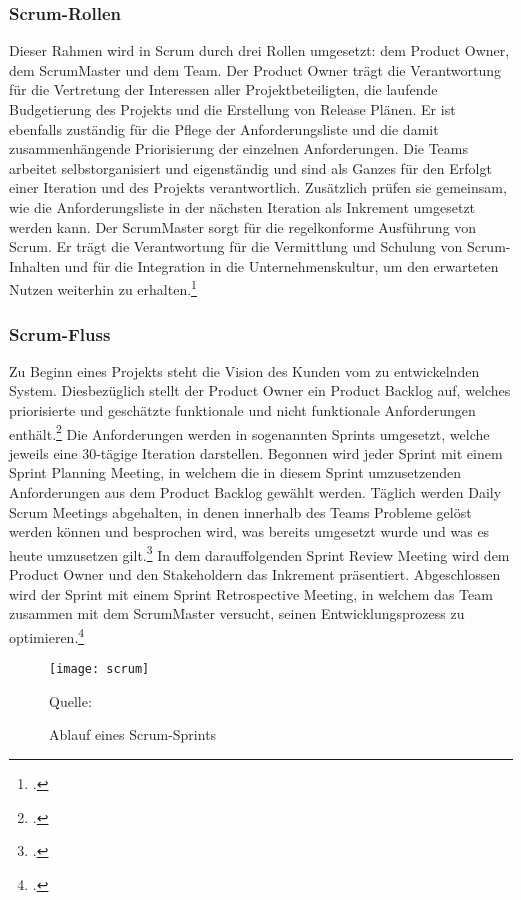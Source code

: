 \subsubsection{Scrum-Rollen}
Dieser Rahmen wird in Scrum durch drei Rollen umgesetzt: dem Product Owner, dem ScrumMaster und dem Team. Der Product Owner trägt die Verantwortung für die Vertretung der Interessen aller Projektbeteiligten, die laufende Budgetierung des Projekts und die Erstellung von Release Plänen. Er ist ebenfalls zuständig für die Pflege der Anforderungsliste und die damit zusammenhängende Priorisierung der einzelnen Anforderungen. Die Teams arbeitet selbstorganisiert und eigenständig und sind als Ganzes für den Erfolgt einer Iteration und des Projekts verantwortlich. Zusätzlich prüfen sie gemeinsam, wie die Anforderungsliste in der nächsten Iteration als Inkrement umgesetzt werden kann. Der ScrumMaster sorgt für die regelkonforme Ausführung von Scrum. Er trägt die Verantwortung für die Vermittlung und Schulung von Scrum-Inhalten und für die Integration in die Unternehmenskultur, um den erwarteten Nutzen weiterhin zu erhalten.\footcite[Vgl.][Seite 7]{schwabo}

\subsubsection{Scrum-Fluss}
Zu Beginn eines Projekts steht die Vision des Kunden vom zu entwickelnden System. Diesbezüglich stellt der Product Owner ein Product Backlog auf, welches priorisierte und geschätzte funktionale und nicht funktionale Anforderungen enthält.\footcite[Vgl.][Seite 8]{schwabo} Die Anforderungen werden in sogenannten Sprints umgesetzt, welche jeweils eine 30-tägige Iteration darstellen. Begonnen wird jeder Sprint mit einem Sprint Planning Meeting, in welchem die in diesem Sprint umzusetzenden Anforderungen aus dem Product Backlog gewählt werden. Täglich werden Daily Scrum Meetings abgehalten, in denen innerhalb des Teams Probleme gelöst werden können und besprochen wird, was bereits umgesetzt wurde und was es heute umzusetzen gilt.\footcite[Vgl.][]{internet3} In dem darauffolgenden Sprint Review Meeting wird dem Product Owner und den Stakeholdern das Inkrement präsentiert. Abgeschlossen wird der Sprint mit einem Sprint Retrospective Meeting, in welchem das Team zusammen mit dem ScrumMaster versucht, seinen Entwicklungsprozess zu optimieren.\footcite[Vgl.][Seite 9]{schwabo} 

\begin{figure}[H]
\begin{center}
\texttt{[image: scrum]}
\caption{Ablauf eines Scrum-Sprints}
Quelle: \cite[][]{scrumbild}
\end{center}
\end{figure}
\vspace{-1cm}

